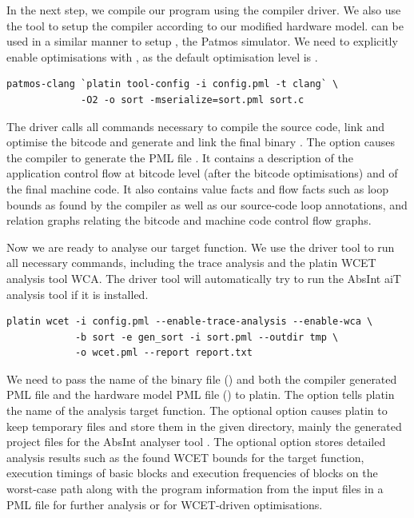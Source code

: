 In the next step, we compile our program using the  compiler driver. We also use the
 tool to setup the compiler according to our modified hardware model.
 can be used in a similar manner to setup , the Patmos simulator.
We need to explicitly enable optimisations with , as the default optimisation level is .

\begin{verbatim}
patmos-clang `platin tool-config -i config.pml -t clang` \
             -O2 -o sort -mserialize=sort.pml sort.c
\end{verbatim}

The driver calls all commands necessary to compile the source code, link and optimise the bitcode and generate
and link the final binary \code{sort}. The option \code{-mserialize} causes the compiler to
generate the PML file \code{sort.pml}. It contains a description of the application control flow at bitcode
level (after the bitcode optimisations) and of the final machine code. It also contains value facts and flow facts
such as loop bounds as found by the compiler as well as our source-code loop annotations, and relation graphs
relating the bitcode and machine code control flow graphs.

Now we are ready to analyse our target function. We use the  driver tool to run all
necessary commands, including the trace analysis and the platin WCET analysis tool WCA. The driver tool
will automatically try to run the AbsInt aiT analysis tool if it is installed.

\begin{verbatim}
platin wcet -i config.pml --enable-trace-analysis --enable-wca \
            -b sort -e gen_sort -i sort.pml --outdir tmp \
            -o wcet.pml --report report.txt
\end{verbatim}

We need to pass the name of the binary file () and both the compiler generated PML file and the
hardware model PML file () to platin. The  option tells platin the name of the analysis
target function. The optional  option causes platin to keep temporary files and store them in
the given directory, mainly the generated project files for the AbsInt analyser tool \code{a3patmos}.
The optional \code{-o} option stores detailed analysis results such as the found WCET bounds for the
target function, execution timings of basic blocks and execution frequencies of blocks on the worst-case path
along with the program information from the input files in a PML file for further analysis or for WCET-driven
optimisations.

